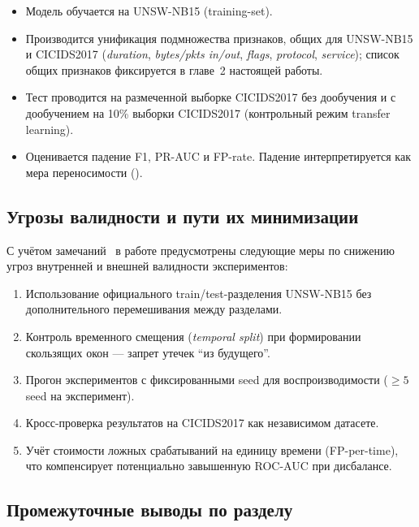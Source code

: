 \begin{itemize}
    \item Модель обучается на UNSW-NB15 (training-set).
    \item Производится унификация подмножества признаков, общих для UNSW-NB15
    и CICIDS2017 (\emph{duration}, \emph{bytes/pkts in/out}, \emph{flags},
    \emph{protocol}, \emph{service}); список общих признаков
    фиксируется в главе~2 настоящей работы.
    \item Тест проводится на размеченной выборке CICIDS2017 без дообучения и
    с дообучением на 10\% выборки CICIDS2017 (контрольный режим transfer
    learning).
    \item Оценивается падение F1, PR-AUC и FP-rate. Падение интерпретируется
    как мера переносимости ().
\end{itemize}

\subsection{Угрозы валидности и пути их минимизации}

С учётом замечаний~\cite{sommer2010outside, pendlebury2019tesseract,
gharib2016evalframework} в работе предусмотрены следующие меры по снижению
угроз внутренней и внешней валидности экспериментов:

\begin{enumerate}
    \item Использование официального train/test-разделения UNSW-NB15 без
    дополнительного перемешивания между разделами.
    \item Контроль временного смещения (\emph{temporal split}) при
    формировании скользящих окон --- запрет утечек ``из будущего''.
    \item Прогон экспериментов с фиксированными seed для воспроизводимости
    (\(\geq 5\) seed на эксперимент).
    \item Кросс-проверка результатов на CICIDS2017 как независимом датасете.
    \item Учёт стоимости ложных срабатываний на единицу времени
    (FP-per-time), что компенсирует потенциально завышенную ROC-AUC при
    дисбалансе.
\end{enumerate}

\subsection{Промежуточные выводы по разделу}

